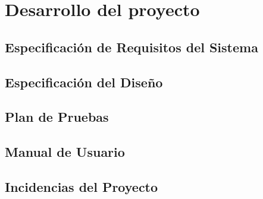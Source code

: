 \section{Desarrollo del proyecto}
\subsection{Especificación de Requisitos del Sistema}
\subsection{Especificación del Diseño}


\subsection{Plan de Pruebas}
\subsection{Manual de Usuario}
\subsection{Incidencias del Proyecto}
\pagebreak